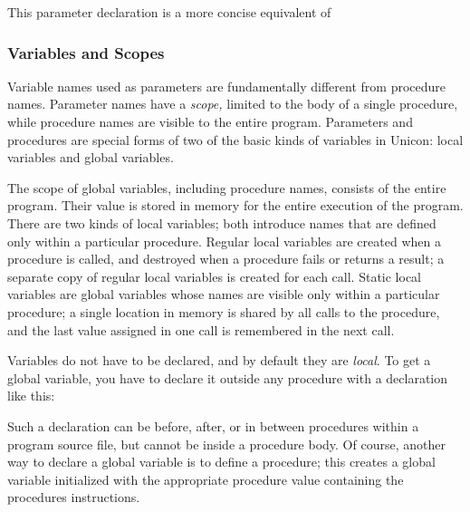 
\noindent
This parameter declaration is a more concise equivalent of


\subsubsection{Variables and Scopes}

Variable names used as parameters are fundamentally
different from procedure names. Parameter names have a
\textit{scope,} limited to the body of a single
procedure, while procedure names are visible to the entire program.
Parameters and procedures are special forms of two of the basic kinds
of variables in Unicon: local variables and global variables.

The scope of global variables, including
procedure names, consists of the entire program. Their value is stored
in memory for the entire execution of the program. There are two kinds
of local variables; both introduce names that
are defined only within a particular procedure. Regular local variables
are created when a procedure is called, and destroyed when a procedure
fails or returns a result; a separate copy of regular local variables
is created for each call. Static local
variables are global variables whose names are visible only within a
particular procedure; a single location in memory is shared by all
calls to the procedure, and the last value assigned in one call is
remembered in the next call.

Variables do not have to be declared, and by default they are
\textit{local}. To get a global variable, you have to declare it
outside any procedure with a declaration like this:


Such a declaration can be before, after, or in between procedures within
a program source file, but cannot be inside a procedure body. Of
course, another way to declare a global variable is to define a
procedure; this creates a global variable initialized with the
appropriate procedure value containing the procedure{\textquotesingle}s
instructions.

